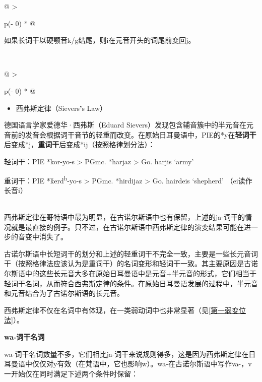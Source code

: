 \begin{longtable}[]{@{}
  >{\raggedright\arraybackslash}p{(\columnwidth - 0\tabcolsep) * }@{}}
\toprule\noalign{}
\begin{minipage}[b]{\linewidth}\raggedright
如果长词干以硬颚音k/g结尾，则i在元音开头的词尾前变回j。
\end{minipage} \\
\midrule\noalign{}
\endhead
\bottomrule\noalign{}
\endlastfoot
\end{longtable}

\begin{longtable}[]{@{}
  >{\raggedright\arraybackslash}p{(\columnwidth - 0\tabcolsep) * }@{}}
\toprule\noalign{}
\begin{minipage}[b]{\linewidth}\raggedright
\begin{itemize}
\item
  西弗斯定律（Sievers\textbf{'}s Law）
\end{itemize}

德国语言学家爱德华·西弗斯（Eduard
Sievers）发现包含辅音簇中的半元音在元音前的发音会根据词干音节的轻重而改变。在原始日耳曼语中，PIE的*y在\textbf{轻词干}后变成*j，\textbf{重词干}后变成*ij（按照格律划分法）：

轻词干：PIE *kor-yo-s \textgreater{} PGmc. *harjaz \textgreater{} Go.
harjis `army'

重词干：PIE *ḱerd\textsuperscript{h}-yo-s \textgreater{} PGmc. *hirdijaz
\textgreater{} Go. hairdeis `shepherd' （ei读作长音i）
\end{minipage} \\
\midrule\noalign{}
\endhead
\bottomrule\noalign{}
\endlastfoot
西弗斯定律在哥特语中最为明显，在古诺尔斯语中也有保留，上述的ja-词干的情况就是最直接的例子。只不过，在古诺尔斯语中西弗斯定律的演变结果可能在进一步的音变中消失了。

古诺尔斯语中长短词干的划分和上述的轻重词干不完全一致，主要是一些长元音词干（按照格律法应该认为是重词干）的名词变形和轻词干一致。其主要原因是古诺尔斯语中的这些长元音大多在原始日耳曼语中是元音+半元音的形式，它们相当于轻词干名词，从而符合西弗斯定律的条件。在原始日耳曼语发展的过程中，半元音和元音结合为了古诺尔斯语的长元音。

西弗斯定律不仅在名词中有体现，在一类弱动词中也非常显著（见\ref{第一弱变位法}）。 \\
\end{longtable}

\textbf{wa-词干名词}

wa-词干名词数量不多，它们相比ja-词干来说规则得多，这是因为西弗斯定律在日耳曼语中仅仅对y有效（在梵语中，它也影响w）。wa-在古诺尔斯语中写作va-，v一开始仅在同时满足下述两个条件时保留：

